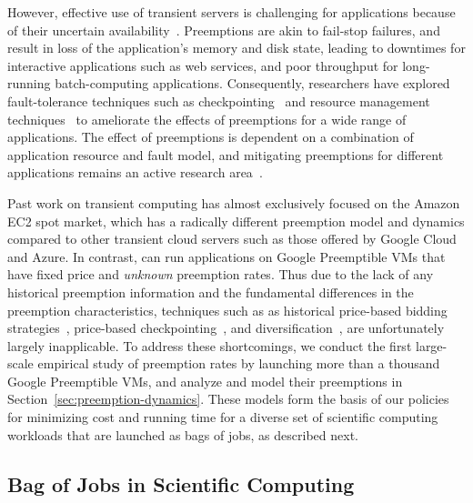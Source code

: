 However, effective use of transient servers is challenging for applications because of their uncertain availability~\cite{spotcheck, prateek-thesis}. 
Preemptions are akin to fail-stop failures, and result in loss of the application's memory and disk state, leading to downtimes for interactive applications such as web services, and poor throughput for long-running batch-computing applications. 
Consequently, researchers have explored fault-tolerance techniques such as checkpointing~\cite{flint, marathe2014exploiting, spoton} and resource management techniques~\cite{exosphere} to ameliorate the effects of preemptions for a wide range of applications. 
The effect of preemptions is dependent on a combination of application resource and fault model, and mitigating preemptions for different applications remains an active research area~\cite{hourglass-eurosys19}.




  Past work on transient computing has almost exclusively focused on the Amazon EC2 spot market, which has a radically different preemption model and dynamics compared to other transient cloud servers such as those offered by Google Cloud and Azure. 
  In contrast, \sysname can run applications on Google Preemptible VMs that have fixed price and \emph{unknown} preemption rates.
  Thus due to the lack of any historical preemption information and the fundamental differences in the preemption characteristics, techniques such as  as historical price-based bidding strategies~\cite{bid-cloud}, price-based checkpointing~\cite{marathe2014exploiting, xinhpdc, spoton}, and diversification~\cite{exosphere, spotweb}, are unfortunately largely inapplicable. 
%
To address these shortcomings, we conduct the first large-scale empirical study of preemption rates by launching more than a thousand Google Preemptible VMs, and analyze and model their preemptions in Section~\ref{sec:preemption-dynamics}. 
  These models form the basis of our policies for minimizing cost and running time for a diverse set of scientific computing workloads that are launched as bags of jobs, as described next. 
  

\vspace*{\subsecspace}
\subsection{Bag of Jobs in Scientific Computing}

